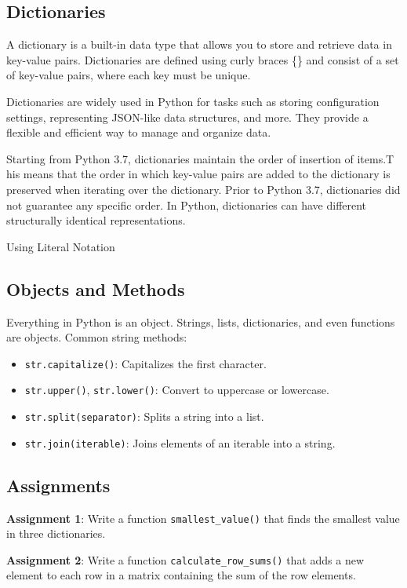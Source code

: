 \documentclass{article}
\begin{document}
\subsection{Dictionaries}
A dictionary is a built-in data type that allows you to store and retrieve data in key-value pairs. Dictionaries are defined using curly braces \{\} and consist of a set of key-value pairs, where each key must be unique.

Dictionaries are widely used in Python for tasks such as storing configuration settings, representing JSON-like data structures, and more. They provide a flexible and efficient way to manage and organize data.

Starting from Python 3.7, dictionaries maintain the order of insertion of items.T his means that the order in which key-value pairs are added to the dictionary is preserved when iterating over the dictionary. Prior to Python 3.7, dictionaries did not guarantee any specific order.
In Python, dictionaries can have different structurally identical representations. 

Using Literal Notation

\subsection{Objects and Methods}
Everything in Python is an object. Strings, lists, dictionaries, and even functions are objects.
Common string methods:
\begin{itemize}
    \item \texttt{str.capitalize()}: Capitalizes the first character.
    \item \texttt{str.upper()}, \texttt{str.lower()}: Convert to uppercase or lowercase.
    \item \texttt{str.split(separator)}: Splits a string into a list.
    \item \texttt{str.join(iterable)}: Joins elements of an iterable into a string.
\end{itemize}

\subsection{Assignments}
\textbf{Assignment 1}: Write a function \texttt{smallest\_value()} that finds the smallest value in three dictionaries.

\textbf{Assignment 2}: Write a function \texttt{calculate\_row\_sums()} that adds a new element to each row in a matrix containing the sum of the row elements.
\end{document}
